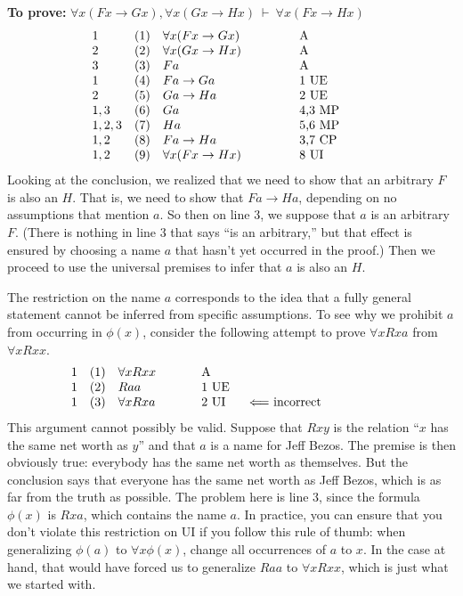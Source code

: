 \medskip \noindent \textbf{To prove:} $\forall x(Fx\to Gx),\forall x(Gx\to Hx)\:\vdash\: \forall x(Fx\to Hx)$
\[ \begin{array}{l l >{$}p{3.5cm}<{$} p{2cm}}
     1 & (1) & \forall x(Fx\to Gx) & A \\
     2 & (2) & \forall x(Gx\to Hx) & A \\
     3 & (3) & Fa                  & A \\
     1 & (4) & Fa\to Ga            & 1 UE \\
     2 & (5) & Ga\to Ha            & 2 UE \\
     1,3 & (6) & Ga                & 4,3 MP \\
     1,2,3 & (7) & Ha              & 5,6 MP \\
     1,2 & (8) & Fa\to Ha          & 3,7 CP \\
     1,2 & (9) & \forall x(Fx\to Hx) & 8 UI \end{array} \] Looking at
 the conclusion, we realized that we need to show that an arbitrary $F$ is also an $H$.  That is, we need to show that $Fa\to Ha$, depending on no assumptions that mention $a$.  So then on line 3, we suppose that $a$ is an arbitrary $F$.  (There is nothing in line 3 that says ``is an arbitrary,'' but that effect is ensured by choosing a name $a$ that hasn't yet occurred in the proof.)  Then we proceed to use the universal premises to infer that $a$ is also an $H$.
 
 The restriction on the name $a$ corresponds to the idea that a fully
 general statement cannot be inferred from specific assumptions.  To
 see why we prohibit $a$ from occurring in $\phi (x)$, consider the
 following attempt to prove $\forall xRxa$ from $\forall xRxx$.
\[ \begin{array}{l l >{$}p{2cm}<{$} p{1cm} p{4cm}}
     1 & (1) & \forall xRxx & A \\
     1 & (2) & Raa          & 1 UE \\
     1 & (3) & \forall xRxa & 2 UI &
                                     $\Longleftarrow$
                                     incorrect \end{array} \] %
This argument cannot possibly be valid.  Suppose that $Rxy$ is the
relation ``$x$ has the same net worth as $y$'' and that $a$ is a name
for Jeff Bezos.  The premise is then obviously true: everybody has the
same net worth as themselves.  But the conclusion says that everyone
has the same net worth as Jeff Bezos, which is as far from the truth
as possible.  The problem here is line 3, since the formula $\phi (x)$
is $Rxa$, which contains the name $a$.  In practice, you can ensure
that you don't violate this restriction on UI if you follow this rule
of thumb: when generalizing $\phi (a)$ to $\forall x\phi (x)$, 
change all occurrences of $a$ to $x$. In the case at hand, that would
have forced us to generalize $Raa$ to $\forall xRxx$, which is just
what we started with.

